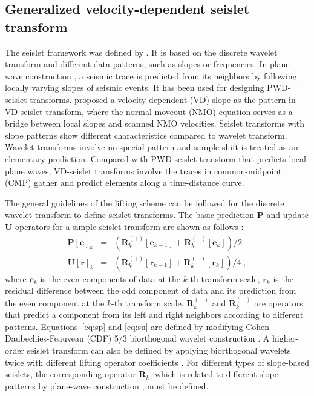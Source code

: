 \subsection{Generalized velocity-dependent seislet transform}

The seislet framework was defined by \cite{Fomel10a}. It is based on
the discrete wavelet transform and different data patterns, such as
slopes or frequencies. In plane-wave construction
\cite[]{Fomel06b,Fomel10b}, a seismic trace is predicted from its 
neighbors by following locally varying slopes of seismic events. It
has been used for designing PWD-seislet transforms. \cite{Liu15}
proposed a velocity-dependent (VD) slope as the pattern in VD-seislet
transform, where the normal moveout (NMO) equation serves as a bridge
between local slopes and scanned NMO velocities. Seislet transforms
with slope patterns show different characteristics compared to wavelet
transform. Wavelet transforms involve no special pattern and sample
shift is treated as an elementary prediction. Compared with
PWD-seislet transform that predicts local plane waves, VD-seislet
transforms involve the traces in common-midpoint (CMP) gather and
predict elements along a time-distance curve.

The general guidelines
of the lifting scheme \cite[]{athome} can be followed for the
discrete wavelet transform to define seislet
transforms. The basic prediction $\mathbf{P}$ and update $\mathbf{U}$
operators for a simple seislet transform are shown as follows
\cite[]{Fomel10a}:
\begin{eqnarray}
  \label{eq:sp}
  \mathbf{P[e]}_k & = & \left(\mathbf{R}_k^{(+)}[\mathbf{e}_{k-1}] + 
  \mathbf{R}_k^{(-)}[\mathbf{e}_{k}]\right)/2 \\
  \label{eq:su}
  \mathbf{U[r]}_k & = & \left(\mathbf{R}_k^{(+)}[\mathbf{r}_{k-1}] + 
    \mathbf{R}_k^{(-)}[\mathbf{r}_{k}]\right)/4\;,
\end{eqnarray}
where $\mathbf{e}_k$ is the even components of data at the $k$-th
transform scale, $\mathbf{r}_k$ is the residual difference between the
odd component of data and its prediction from the even component at
the $k$-th transform scale.  $\mathbf{R}_k^{(+)}$ and
$\mathbf{R}_k^{(-)}$ are operators that predict a component from its
left and right neighbors according to different
patterns. Equations~\ref{eq:sp} and \ref{eq:su} are defined by
modifying Cohen-Daubechies-Feauveau (CDF) 5/3 biorthogonal wavelet
construction \cite[]{Cohen92}. A higher-order seislet transform can
also be defined by applying biorthogonal wavelets twice with different
lifting operator coefficients \cite[]{Lian01}. For different types of
slope-based seislets, the corresponding operator $\mathbf{R}_k$, which
is related to different slope patterns by plane-wave construction
\cite[]{Fomel10b}, must be defined.

